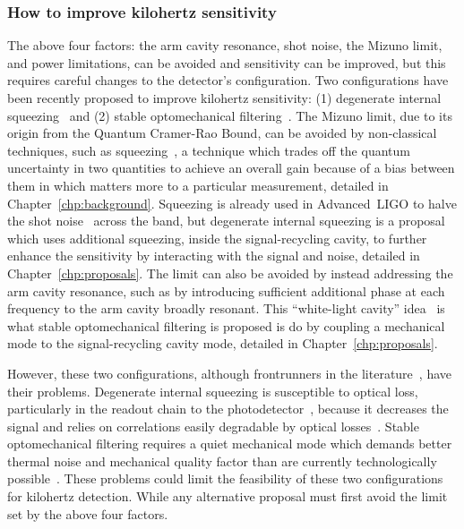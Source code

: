 
\subsubsection{How to improve kilohertz sensitivity}

The above four factors: the arm cavity resonance, shot noise, the Mizuno limit, and power limitations, can be avoided and sensitivity can be improved, but this requires careful changes to the detector's configuration. Two configurations have been recently proposed to improve kilohertz sensitivity: (1) degenerate internal squeezing~\cite{Korobko2019,Adya2020} and (2) stable optomechanical filtering~\cite{Li2020,Miao2015}. 
The Mizuno limit, due to its origin from the Quantum Cramer-Rao Bound, can be avoided by non-classical techniques, such as squeezing~\cite{}, a technique which trades off the quantum uncertainty in two quantities to achieve an overall gain because of a bias between them in which matters more to a particular measurement, detailed in Chapter~\ref{chp:background}. Squeezing is already used in Advanced~LIGO to halve the shot noise~\cite{tseQuantumEnhancedAdvancedLIGO2019} across the band, but degenerate internal squeezing is a proposal which uses additional squeezing, inside the signal-recycling cavity, to further enhance the sensitivity by interacting with the signal and noise, detailed in Chapter~\ref{chp:proposals}. 
The limit can also be avoided by instead addressing the arm cavity resonance, such as by introducing sufficient additional phase at each frequency to the arm cavity broadly resonant. This ``white-light cavity'' idea~\cite{} is what stable optomechanical filtering is proposed is do by coupling a mechanical mode to the signal-recycling cavity mode, detailed in Chapter~\ref{chp:proposals}.

However, these two configurations, although frontrunners in the literature~\cite{}, have their problems. Degenerate internal squeezing is susceptible to optical loss, particularly in the readout chain to the photodetector~, because it decreases the signal and relies on correlations easily degradable by optical losses~\cite{Korobko2019}. Stable optomechanical filtering requires a quiet mechanical mode which demands better thermal noise and mechanical quality factor than are currently technologically possible~\cite{Li2020,Miao2015}. These problems could limit the feasibility of these two configurations for kilohertz detection. While any alternative proposal must first avoid the limit set by the above four factors.


